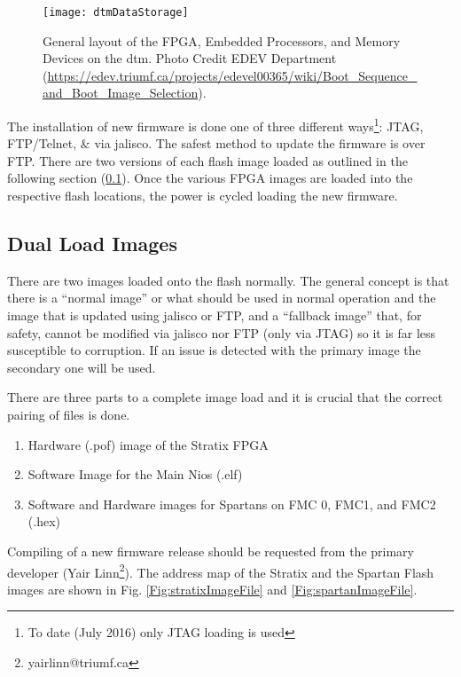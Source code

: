 \begin{figure}[ht]
\centering
\texttt{[image: dtmDataStorage]}
\caption{General layout of the FPGA, Embedded Processors, and Memory Devices on the \gls{dtm}. Photo Credit EDEV Department (\url{https://edev.triumf.ca/projects/edevel00365/wiki/Boot_Sequence_and_Boot_Image_Selection}).}
\label{Fig:dtmDataStorage}
\end{figure}

The installation of new firmware is done one of three different ways\footnote{To date (July 2016) only JTAG loading is used}: JTAG, FTP/Telnet, $\&$ via \gls{jalisco}. The safest method to update the firmware is over FTP. %
There are two versions of each flash image loaded as outlined in the following section (\ref{sec:dualImages}). Once the various FPGA images are loaded into the respective flash locations, the power is cycled loading the new firmware. 


\subsection{Dual Load Images}
\label{sec:dualImages}
There are two images loaded onto the flash normally. The general concept is that there is a “normal image” or what should be used in normal operation and the image that is updated using \gls{jalisco} or FTP, and a “fallback image” that, for safety, cannot be modified via \gls{jalisco} nor FTP (only via JTAG) so it is far less susceptible to corruption. If an issue is detected with the primary image the secondary one will be used. 

There are three parts to a complete image load and it is crucial that the correct pairing of files is done.
\begin{enumerate}
\item Hardware (.pof) image of the Stratix FPGA
\item Software Image for the Main Nios (.elf)
\item Software and Hardware images for Spartans on FMC 0, FMC1, and FMC2 (.hex)
\end{enumerate}

Compiling of a new firmware release should be requested from the primary developer (Yair Linn\footnote{yairlinn@triumf.ca}).
The address map of the Stratix and the Spartan Flash images are shown in Fig. \ref{Fig:stratixImageFile} and \ref{Fig:spartanImageFile}.%

